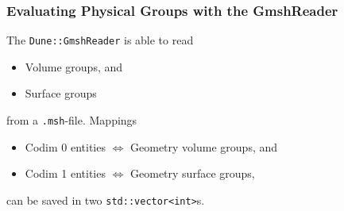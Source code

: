 \begin{frame}
  \frametitle<presentation>{Evaluating Physical Groups with the GmshReader}
  The \lstinline!Dune::GmshReader! is able to read
  \begin{itemize}
    \item Volume groups, and
    \item Surface groups
  \end{itemize}
  from a \lstinline!.msh!-file. Mappings
  \begin{itemize}
    \item Codim 0 entities $\Leftrightarrow$ Geometry volume groups, and
    \item Codim 1 entities $\Leftrightarrow$ Geometry surface groups,
  \end{itemize}
  can be saved in two \lstinline!std::vector<int>!s.
\end{frame}

